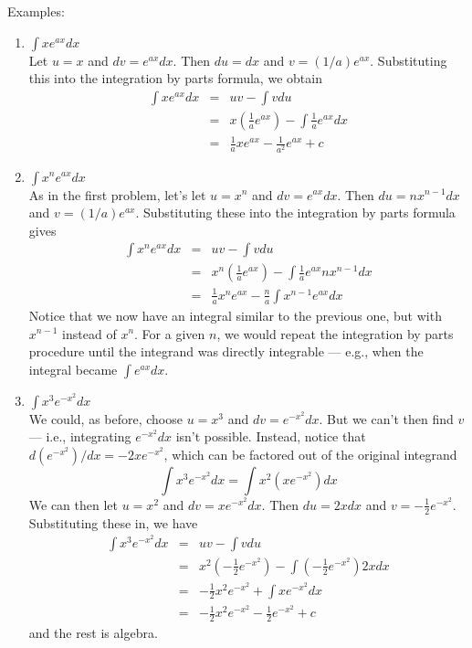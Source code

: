 \documentclass[11pt]{article}
\newcommand{\be}{\begin{enumerate}}
\newcommand{\ee}{\end{enumerate}}
\newcommand{\beqa}{\begin{eqnarray}}
\newcommand{\eeqa}{\end{eqnarray}}
\newcommand{\non}{\nonumber}
\begin{document}
\item Examples:
  \be
  \item $\int x e^{ax} dx$\\[6pt]
  Let $u=x$ and $dv=e^{ax}dx$.  Then $du=dx$ and $v=(1/a)e^{ax}$.
Substituting this into the integration by parts formula, we obtain
\beqa
\int x e^{ax} dx &=& u v - \int v du\non\\
         &=&x\left( \frac{1}{a}e^{ax}\right) -
            \int\frac{1}{a}e^{ax}dx\non\\
         &=&\frac{1}{a}xe^{ax}-\frac{1}{a^2}e^{ax}+c\non
\eeqa
   \item $\int x^n e^{ax} dx$\\[6pt]
   As in the first problem, let's let $u=x^n$ and $dv=e^{ax}dx$.  Then
$du=n x^{n-1}dx$ and $v=(1/a)e^{ax}$.  Substituting these into the
integration by parts formula gives
\beqa
\int x^n e^{ax} dx &=& u v - \int v du\non\\
         &=&x^n\left( \frac{1}{a}e^{ax}\right) -
            \int\frac{1}{a}e^{ax} n x^{n-1} dx\non\\
         &=&\frac{1}{a}x^n e^{ax} -
             \frac{n}{a}\int x^{n-1}e^{ax}dx\non
\eeqa
Notice that we now have an integral similar to the previous one, but
with $x^{n-1}$ instead of $x^n$.  For a given $n$, we would repeat the
integration by parts procedure until the integrand was directly
integrable --- e.g., when the integral became $\int e^{ax}dx$.\\

  \item $\int x^3 e^{-x^2} dx$\\[6pt]
  We could, as before, choose $u=x^3$ and $dv=e^{-x^2}dx$.  But we
can't then find $v$ --- i.e., integrating $e^{-x^2}dx$ isn't possible.
Instead, notice that $d(e^{-x^2})/dx=-2xe^{-x^2}$, which can be factored
out of the original integrand $$\int x^3 e^{-x^2} dx = \int x^2
(xe^{-x^2})dx$$  We can then let $u=x^2$ and $dv=x e^{-x^2}dx$.  Then
$du=2x dx$ and $v=-\frac{1}{2}e^{-x^2}$.  Substituting these in, we have
\beqa
\int x^3 e^{-x^2} dx &=& u v - \int v du\non\\
             &=& x^2 \left( -\frac{1}{2}e^{-x^2}\right)
                 -\int \left(-\frac{1}{2}e^{-x^2}\right)2x dx\non\\
             &=& -\frac{1}{2}x^2 e^{-x^2}+\int x e^{-x^2}dx\non\\
             &=& -\frac{1}{2}x^2 e^{-x^2}-\frac{1}{2}e^{-x^2}+c\non
\eeqa
and the rest is algebra.

  \ee
\end{document}
